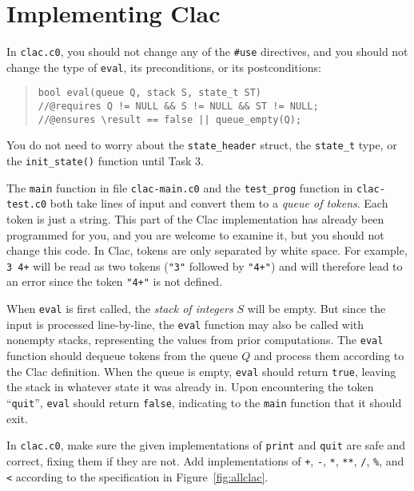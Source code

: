 \documentclass[12pt]{exam}
\begin{document}
\section{Implementing Clac}

In \lstinline'clac.c0', you should not change any of the \lstinline'#use'
directives, and you should not change the type of \lstinline'eval', its
preconditions, or its postconditions:
\begin{quote}
\begin{lstlisting}[numbers=none]
bool eval(queue Q, stack S, state_t ST)
//@requires Q != NULL && S != NULL && ST != NULL;
//@ensures \result == false || queue_empty(Q);
\end{lstlisting}
\end{quote}
You do not need to worry about the \lstinline'state_header' struct, the
\lstinline'state_t' type, or the \lstinline'init_state()' function until Task 3.

The \lstinline'main' function in file \lstinline'clac-main.c0' and the
\lstinline'test_prog' function in \lstinline'clac-test.c0' both take lines of
input and convert them to a \emph{queue of tokens}. Each token is just
a string.  This part of the Clac implementation has already been
programmed for you, and you are welcome to examine it, but you should
not change this code.  In Clac, tokens are only separated by
white space.  For example, \lstinline'3 4+' will be read as two tokens
(\lstinline'"3"' followed by \lstinline'"4+"') and will therefore lead to an
error since the token \lstinline'"4+"' is not defined.

When \lstinline'eval' is first called, the \emph{stack of integers} $S$
will be empty.  But since the input is processed line-by-line, the
\lstinline'eval' function may also be called with nonempty stacks,
representing the values from prior computations.
The \lstinline'eval' function should dequeue tokens from the queue $Q$ and
process them according to the Clac definition.  When the queue is
empty, \lstinline'eval' should return \lstinline'true', leaving the stack in
whatever state it was already in.  Upon encountering the token ``\lstinline'quit''',
\lstinline'eval' should return \lstinline'false', indicating to the \lstinline'main'
function that it should exit.

\begin{task}[9]
  In \lstinline'clac.c0', make sure the given implementations of
  \lstinline'print' and \lstinline'quit' are safe and correct, fixing
  them if they are not. Add implementations of \lstinline'+',
  \lstinline'-', \lstinline'*', \lstinline'**', \lstinline'/',
  \lstinline'%', and \lstinline'<' according to the specification in
  Figure~\ref{fig:allclac}.
\end{task}
\end{document}
